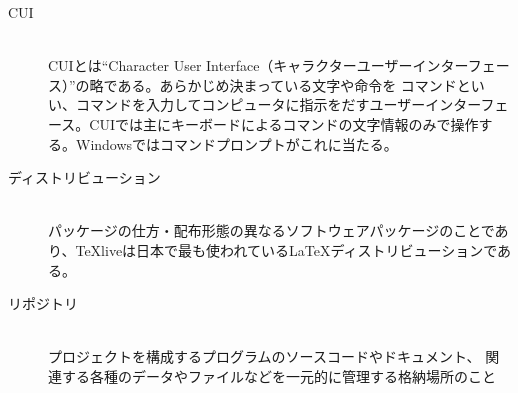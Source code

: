 \documentclass[titlepage]{ltjsarticle}
\begin{document}
\begin{description}
    \item[CUI]~\\
      CUIとは``Character User Interface（キャラクターユーザーインターフェース）''の略である。あらかじめ決まっている文字や命令を コマンドといい、コマンドを入力してコンピュータに指示をだすユーザーインターフェース。CUIでは主にキーボードによるコマンドの文字情報のみで操作する。Windowsではコマンドプロンプトがこれに当たる。
    \item[ディストリビューション]~\\
    パッケージの仕方・配布形態の異なるソフトウェアパッケージのことであり、TeXliveは日本で最も使われているLaTeXディストリビューションである。
   

  \item [リポジトリ] ~\\
    プロジェクトを構成するプログラムのソースコードやドキュメント、
    関連する各種のデータやファイルなどを一元的に管理する格納場所のこと
\end{description}
\end{document}
